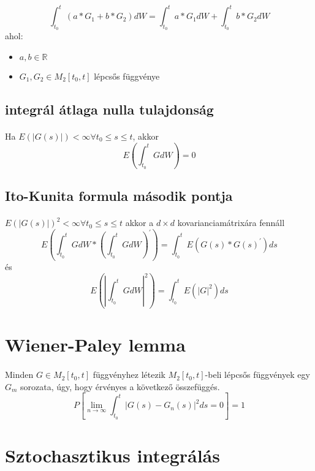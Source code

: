 \documentclass[11pt,a4paper]{article}
\begin{document}
					\paragraph{}
					$$\int_{t_0}^t (a*G_1 + b*G_2) dW =\int_{t_0}^t a*G_1 dW + \int_{t_0}^t b*G_2 dW$$
					ahol:
					\begin{itemize}
						\item $a,b \in \mathbb{R}$
						\item $G_1, G_2 \in M_2[t_0,t]$ lépcsős függvénye
					\end{itemize}
				\subsection{integrál átlaga nulla tulajdonság}
					\paragraph{}
						Ha $E(|G(s)|) < \infty \forall t_0 \le s \le t$, akkor
						$$E\left( \int_{t_0}^t G dW \right)=0$$
				\subsection{Ito-Kunita formula második pontja}
					\paragraph{}
						$E(|G(s)|)^2 < \infty \forall t_0 \le s \le t$ akkor a $d \times d$ kovarianciamátrixára fennáll
						$$E\left( \int_{t_0}^t G dW * \left( \int_{t_0}^t G dW \right)^\prime \right) = \int_{t_0}^t E(G(s)*G(s)^\prime)ds$$
						és
						$$E\left( \left| \int_{t_0}^t G dW \right|^2 \right) = \int_{t_0}^t E(|G|^2)ds$$
			\section{Wiener-Paley lemma}
				\paragraph{}
					Minden $G \in M_2[t_0, t]$ függvényhez létezik $M_2[t_0,t]$-beli lépcsős függvények egy $G_m$ sorozata, úgy, hogy érvényes a következő összefüggés.
					$$P\left[ \lim_{n \to \infty} {\int_{t_0}^t {|G(s) - G_n(s)|^2}ds } = 0\right] = 1$$
			\section{Sztochasztikus integrálás}
\end{document}
